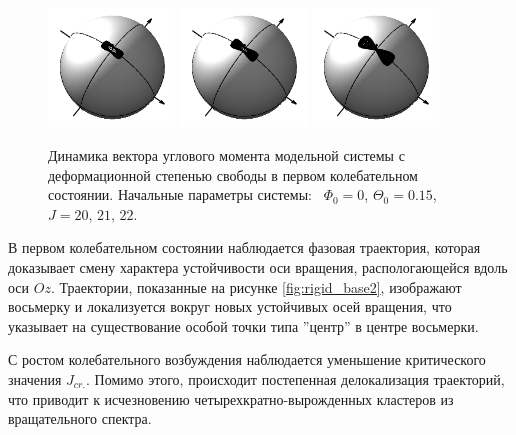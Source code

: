 \begin{figure}[H]
  \centering
	\includegraphics[width=0.3\textwidth]{../pictures/rigid_base/plot_J=20n=1.png}
	\includegraphics[width=0.3\textwidth]{../pictures/rigid_base/plot_J=21n=1.png}
	\includegraphics[width=0.3\textwidth]{../pictures/rigid_base/plot_J=22n=1.png} \\
	\caption{Динамика вектора углового момента модельной системы с деформационной степенью свободы в первом колебательном состоянии. Начальные параметры системы: \ $\Phi_0 = 0$, $\Theta_0 = 0.15$, $J = 20, \, 21, \, 22$.}
	\label{fig:rigid_base2}
\end{figure}

В первом колебательном состоянии наблюдается фазовая траектория, которая доказывает смену характера устойчивости оси вращения, распологающейся вдоль оси $Oz$. Траектории, показанные на рисунке \eqref{fig:rigid_base2}, изображают восьмерку и локализуется вокруг новых устойчивых осей вращения, что указывает на существование особой точки типа ''центр'' в центре восьмерки. \par
С ростом колебательного возбуждения наблюдается уменьшение критического значения $J_{cr.}$. Помимо этого, происходит постепенная делокализация траекторий, что приводит к исчезновению четырехкратно-вырожденных кластеров из вращательного спектра.
